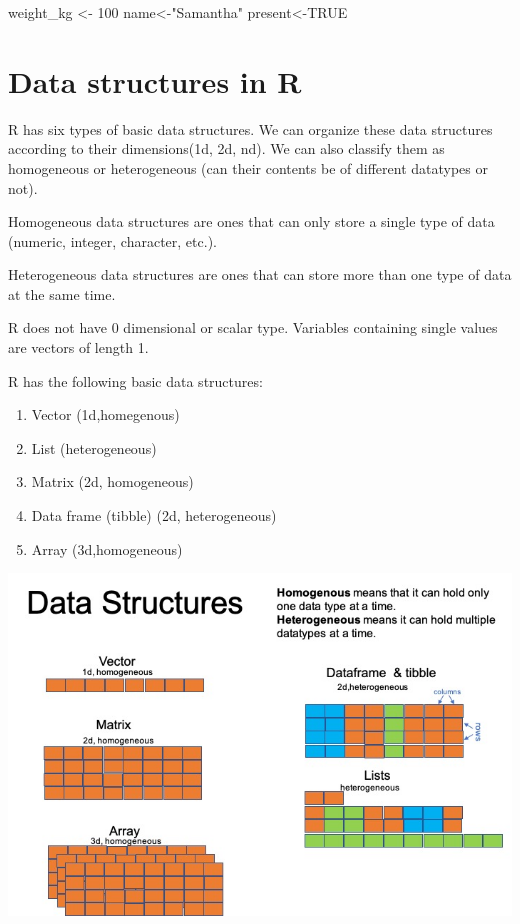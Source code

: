 \documentclass[
]{book}
\newenvironment{Shaded}{\begin{snugshade}}{\end{snugshade}}
\newcommand{\ConstantTok}[1]{\textcolor[rgb]{0.00,0.00,0.00}{#1}}
\newcommand{\DecValTok}[1]{\textcolor[rgb]{0.00,0.00,0.81}{#1}}
\newcommand{\NormalTok}[1]{#1}
\newcommand{\OtherTok}[1]{\textcolor[rgb]{0.56,0.35,0.01}{#1}}
\newcommand{\StringTok}[1]{\textcolor[rgb]{0.31,0.60,0.02}{#1}}
\providecommand{\tightlist}{%
  \setlength{\itemsep}{0pt}\setlength{\parskip}{0pt}}
\begin{document}
\begin{Shaded}
\begin{Highlighting}[]
\NormalTok{weight\_kg }\OtherTok{\textless{}{-}} \DecValTok{100}
\NormalTok{name}\OtherTok{\textless{}{-}}\StringTok{"Samantha"}
\NormalTok{present}\OtherTok{\textless{}{-}}\ConstantTok{TRUE}
\end{Highlighting}
\end{Shaded}

\hypertarget{data-structures-in-r}{%
\section{Data structures in R}\label{data-structures-in-r}}

R has six types of basic data structures. We can organize these data structures according to their dimensions(1d, 2d, nd). We can also classify them as homogeneous or heterogeneous (can their contents be of different datatypes or not).

Homogeneous data structures are ones that can only store a single type of data (numeric, integer, character, etc.).

Heterogeneous data structures are ones that can store more than one type of data at the same time.

R does not have 0 dimensional or scalar type. Variables containing single values are vectors of length 1.

R has the following basic data structures:

\begin{enumerate}
\def\labelenumi{\arabic{enumi}.}
\tightlist
\item
  Vector (1d,homegenous)
\item
  List (heterogeneous)
\item
  Matrix (2d, homogeneous)
\item
  Data frame (tibble) (2d, heterogeneous)
\item
  Array (3d,homogeneous)
\end{enumerate}

\includegraphics{data_s.jpg}
\end{document}
